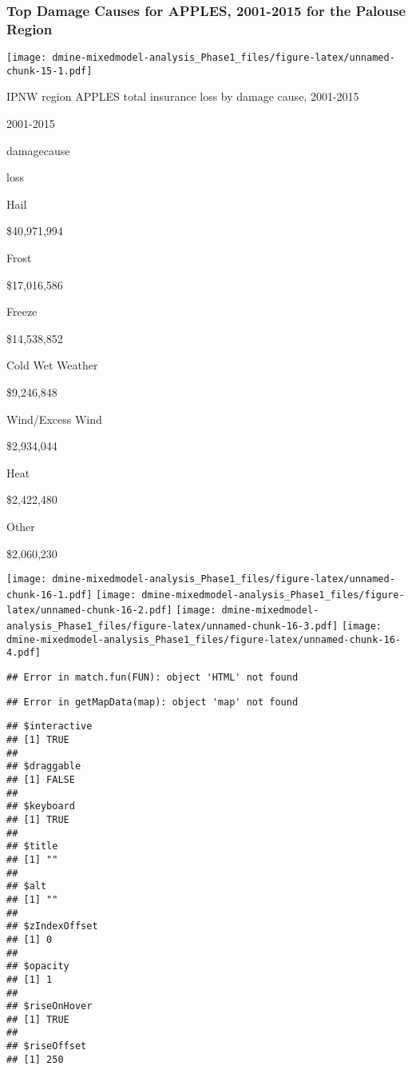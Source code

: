 \documentclass[]{article}
\begin{document}
\subsubsection{Top Damage Causes for APPLES, 2001-2015 for the Palouse
Region}\label{top-damage-causes-for-apples-2001-2015-for-the-palouse-region}

\texttt{[image: dmine-mixedmodel-analysis\_Phase1\_files/figure-latex/unnamed-chunk-15-1.pdf]}

IPNW region APPLES total insurance loss by damage cause, 2001-2015

2001-2015

damagecause

loss

Hail

\$40,971,994

Frost

\$17,016,586

Freeze

\$14,538,852

Cold Wet Weather

\$9,246,848

Wind/Excess Wind

\$2,934,044

Heat

\$2,422,480

Other

\$2,060,230

\texttt{[image: dmine-mixedmodel-analysis\_Phase1\_files/figure-latex/unnamed-chunk-16-1.pdf]}
\texttt{[image: dmine-mixedmodel-analysis\_Phase1\_files/figure-latex/unnamed-chunk-16-2.pdf]}
\texttt{[image: dmine-mixedmodel-analysis\_Phase1\_files/figure-latex/unnamed-chunk-16-3.pdf]}
\texttt{[image: dmine-mixedmodel-analysis\_Phase1\_files/figure-latex/unnamed-chunk-16-4.pdf]}

\begin{verbatim}
## Error in match.fun(FUN): object 'HTML' not found
\end{verbatim}

\begin{verbatim}
## Error in getMapData(map): object 'map' not found
\end{verbatim}

\begin{verbatim}
## $interactive
## [1] TRUE
## 
## $draggable
## [1] FALSE
## 
## $keyboard
## [1] TRUE
## 
## $title
## [1] ""
## 
## $alt
## [1] ""
## 
## $zIndexOffset
## [1] 0
## 
## $opacity
## [1] 1
## 
## $riseOnHover
## [1] TRUE
## 
## $riseOffset
## [1] 250
\end{verbatim}
\end{document}
